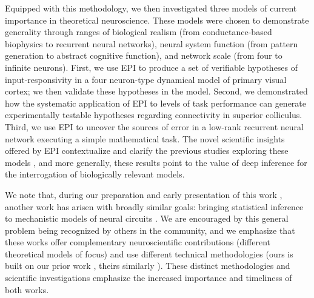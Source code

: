 \documentclass[11pt]{article}
\begin{document}
Equipped with this methodology, we then investigated three models of current importance in theoretical neuroscience.
These models were chosen to demonstrate generality through ranges of biological realism (from conductance-based biophysics to recurrent neural networks), neural system function (from pattern generation to abstract cognitive function), and network scale (from four to infinite neurons).
First, we use EPI to produce a set of verifiable hypotheses of input-responsivity in a four neuron-type dynamical model of primary visual cortex; we then validate these hypotheses in the model.
Second, we demonstrated how the systematic application of EPI to levels of task performance can generate experimentally testable hypotheses regarding connectivity in superior colliculus.  
Third, we use EPI to uncover the sources of error in a low-rank recurrent neural network executing a simple mathematical task.  
The novel scientific insights offered by EPI contextualize and clarify the previous studies exploring these models \cite{gutierrez2013multiple, litwin2016inhibitory, duan2018collicular, mastrogiuseppe2018linking}, and more generally, these results point to the value of deep inference for the interrogation of biologically relevant models.



We note that, during our preparation and early presentation of this work \cite{bittner2019degenerate, bittner2019examining}, another work has arisen with broadly similar goals: bringing statistical inference to mechanistic models of neural circuits \cite{nonnenmacher2018sbi, desitler2019statistical}.  
We are encouraged by this general problem being recognized by others in the community, and we emphasize that these works offer complementary neuroscientific contributions (different theoretical models of focus) and use different technical methodologies (ours is built on our prior work \cite{loaiza2017maximum}, theirs similarly \cite{LueckmannGoncalves_17}).
These distinct methodologies and scientific investigations emphasize the increased importance and timeliness of both works. 
\end{document}
